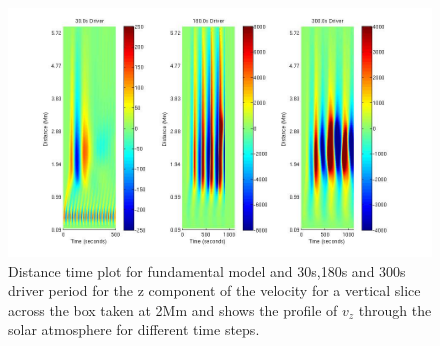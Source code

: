 \documentclass[final,1p]{elsarticle}
\begin{document}



\begin{figure}[h]\label{fig4_dt_30_180_300_0_vert_2Mm}
\includegraphics[scale=0.5]{images/fig4_dt_30_180_300_0_vert_2Mm.jpg}
\caption{Distance time plot for fundamental model and 30s,180s and 300s driver period for the z component of the velocity for a vertical slice across the box  taken at 2Mm and shows  the profile of $v_{z}$ through the solar atmosphere for different time steps. }
\end{figure}


\end{document}
